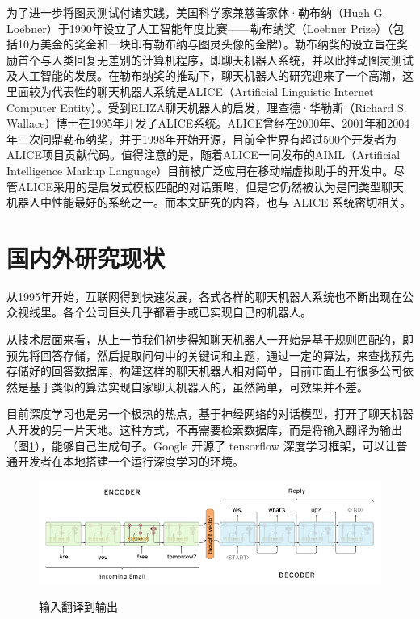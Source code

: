\documentclass[bachelor,winfonts]{jnuthesis}
\begin{document}
为了进一步将图灵测试付诸实践，美国科学家兼慈善家休·勒布纳（Hugh G. Loebner）于1990年设立了人工智能年度比赛——勒布纳奖（Loebner Prize）（包括10万美金的奖金和一块印有勒布纳与图灵头像的金牌）。勒布纳奖的设立旨在奖励首个与人类回复无差别的计算机程序，即聊天机器人系统，并以此推动图灵测试及人工智能的发展。在勒布纳奖的推动下，聊天机器人的研究迎来了一个高潮，这里面较为代表性的聊天机器人系统是ALICE（Artificial Linguistic Internet Computer Entity）\cite{alicewebsite}。受到ELIZA聊天机器人的启发，理查德·华勒斯（Richard S. Wallace）博士在1995年开发了ALICE系统。ALICE曾经在2000年、2001年和2004年三次问鼎勒布纳奖，并于1998年开始开源，目前全世界有超过500个开发者为ALICE项目贡献代码。值得注意的是，随着ALICE一同发布的AIML（Artificial Intelligence Markup Language）目前被广泛应用在移动端虚拟助手的开发中。尽管ALICE采用的是启发式模板匹配的对话策略，但是它仍然被认为是同类型聊天机器人中性能最好的系统之一。而本文研究的内容，也与 ALICE 系统密切相关。


\section{国内外研究现状}
从1995年开始，互联网得到快速发展，各式各样的聊天机器人系统也不断出现在公众视线里。各个公司巨头几乎都着手或已实现自己的机器人。

从技术层面来看，从上一节我们初步得知聊天机器人一开始是基于规则匹配的，即预先将回答存储，然后提取问句中的关键词和主题，通过一定的算法，来查找预先存储好的回答数据库，构建这样的聊天机器人相对简单，目前市面上有很多公司依然是基于类似的算法实现自家聊天机器人的，虽然简单，可效果并不差。

目前深度学习也是另一个极热的热点，基于神经网络的对话模型\cite{seq2seq}，打开了聊天机器人开发的另一片天地。这种方式，不再需要检索数据库，而是将输入翻译为输出（图\ref{fig:pic1}），能够自己生成句子。Google 开源了 tensorflow 深度学习框架，可以让普通开发者在本地搭建一个运行深度学习的环境。

\begin{figure}[htbp]
  \centering
  \includegraphics[width= 1\textwidth]{nct-seq2seq.png}\\
  \caption{输入翻译到输出}\label{fig:pic1}
\end{figure}
\end{document}
